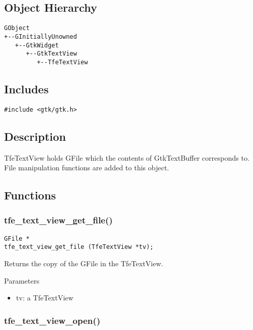 \hypertarget{object-hierarchy}{%
\subsection{Object Hierarchy}\label{object-hierarchy}}

\begin{lstlisting}
GObject
+--GInitiallyUnowned
   +--GtkWidget
      +--GtkTextView
         +--TfeTextView
\end{lstlisting}

\hypertarget{includes}{%
\subsection{Includes}\label{includes}}

\begin{lstlisting}
#include <gtk/gtk.h>
\end{lstlisting}

\hypertarget{description}{%
\subsection{Description}\label{description}}

TfeTextView holds GFile which the contents of GtkTextBuffer corresponds
to. File manipulation functions are added to this object.

\hypertarget{functions-1}{%
\subsection{Functions}\label{functions-1}}

\hypertarget{tfe_text_view_get_file}{%
\subsubsection{tfe\_text\_view\_get\_file()}\label{tfe_text_view_get_file}}

\begin{lstlisting}
GFile *
tfe_text_view_get_file (TfeTextView *tv);
\end{lstlisting}

Returns the copy of the GFile in the TfeTextView.

Parameters

\begin{itemize}
\tightlist
\item
  tv: a TfeTextView
\end{itemize}

\hypertarget{tfe_text_view_open}{%
\subsubsection{tfe\_text\_view\_open()}\label{tfe_text_view_open}}

